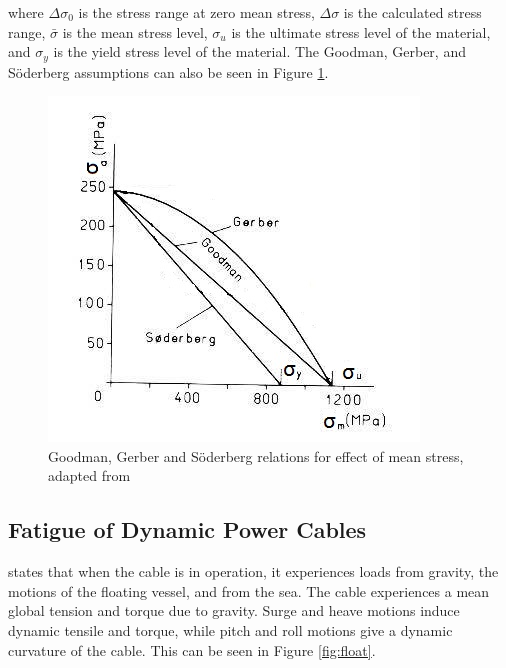 \noindent where $\Delta \sigma_0$ is the stress range at zero mean stress, $\Delta \sigma$ is the calculated stress range, $\bar{\sigma}$ is the mean stress level, $\sigma_u$ is the ultimate stress level of the material, and $\sigma_y$ is the yield stress level of the material. The Goodman, Gerber, and Söderberg assumptions can also be seen in Figure \ref{fig:gerber}. 

\begin{figure}[H]
\centering
\includegraphics[scale=0.8]{figures/soder.PNG}
\caption[$\; \:$Goodman, Gerber and Söderberg relations for effect of mean stress]{Goodman, Gerber and Söderberg relations for effect of mean stress, adapted from \cite{fatiguehand} }
 \label{fig:gerber}
\end{figure}

\subsection{Fatigue of Dynamic Power Cables}
\noindent \cite{Nasution2013} states that when the cable is in operation, it experiences loads from gravity, the motions of the floating vessel, and from the sea. The cable experiences a mean global tension and torque due to gravity. Surge and heave motions induce dynamic tensile and torque, while pitch and roll motions give a dynamic curvature of the cable. This can be seen in Figure \ref{fig:float}. 

